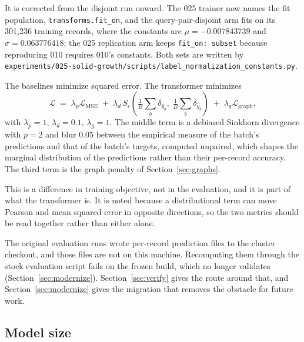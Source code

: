 It is corrected from the disjoint run onward. The 025 trainer now names the
fit population, \texttt{transforms.fit\_on}, and the query-pair-disjoint arm
fits on its 301{,}236 training records, where the constants are
$\mu = -0.007843739$ and $\sigma = 0.063776418$; the 025 replication arm keeps
\texttt{fit\_on: subset} because reproducing 010 requires 010's constants.
Both sets are written by
\texttt{experiments/025-solid-growth/scripts/label\_normalization\_constants.py}.

The baselines minimize squared error. The transformer minimizes
%
\begin{equation}
  \mathcal{L} \;=\; \lambda_p \mathcal{L}_{\mathrm{MSE}}
  \;+\; \lambda_d\, S_{\epsilon}\!\left(
    \tfrac{1}{B}\textstyle\sum_b \delta_{\hat{y}_b},\;
    \tfrac{1}{B}\textstyle\sum_b \delta_{y_b}\right)
  \;+\; \lambda_g \mathcal{L}_{\mathrm{graph}},
  \label{eq:loss}
\end{equation}
%
with $\lambda_p = 1$, $\lambda_d = 0.1$, $\lambda_g = 1$. The middle term is a
debiased Sinkhorn divergence with $p = 2$ and blur $0.05$ between the empirical
measure of the batch's predictions and that of the batch's targets, computed
unpaired, which shapes the marginal distribution of the predictions rather than
their per-record accuracy. The third term is the graph penalty of
Section~\ref{sec:graphs}.

This is a difference in training objective, not in the evaluation, and it is
part of what the transformer is. It is noted because a distributional term can
move Pearson and mean squared error in opposite directions, so the two metrics
should be read together rather than either alone.

The original evaluation runs wrote per-record prediction files to the cluster
checkout, and those files are not on this machine. Recomputing them through the
stock evaluation script fails on the frozen build, which no longer validates
(Section~\ref{sec:modernize}). Section~\ref{sec:verify} gives the route around
that, and Section~\ref{sec:modernize} gives the migration that removes the
obstacle for future work.

\subsection{Model size}

